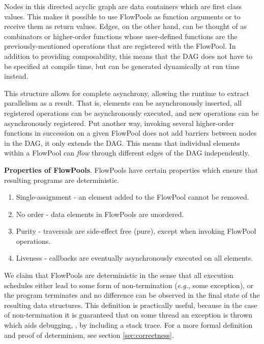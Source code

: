 Nodes in this directed acyclic graph are data containers which are first class
values. This makes it possible to use FlowPools as function arguments or to receive
them as return values. Edges, on the other hand, can be thought of as
combinators or higher-order functions whose user-defined functions are the
previously-mentioned operations that are registered with the FlowPool. In
addition to providing composability, this means that the DAG does not have to
be specified at compile time, but can be generated dynamically at run time
instead.

This structure allows for complete asynchrony, allowing the runtime to extract
parallelism as a result. That is, elements can be asynchronously inserted, all
registered operations can be asynchronously executed, and new operations can
be asynchronously registered.
Put another way, invoking several higher-order functions in succession on a given
FlowPool does not add barriers between nodes in the DAG, it only extends the DAG.
This means that individual elements within a FlowPool can \textit{flow} through
different edges of the DAG independently.

\textbf{Properties of FlowPools}. FlowPools have certain properties
which ensure that resulting programs are deterministic.

\begin{enumerate}
\item Single-assignment - an element added to the FlowPool cannot be removed.
\item No order - data elements in FlowPools are unordered.
\item Purity - traversals are side-effect free (pure), except when invoking FlowPool operations.
\item Liveness - callbacks are eventually asynchronously executed on all elements.
\end{enumerate}


We claim that FlowPools are deterministic in the sense that all execution
schedules either lead to some form of non-termination (\textit{e.g.}, some
exception), or the program terminates and no difference can be observed in the
final state of the resulting data structures. This definition is practically
useful, because in the case of non-termination it is guaranteed that on some
thread an exception is thrown which aids debugging, \eg, by including a stack
trace. For a more formal definition and proof of determinism, see section
\ref{sec:correctness}.


